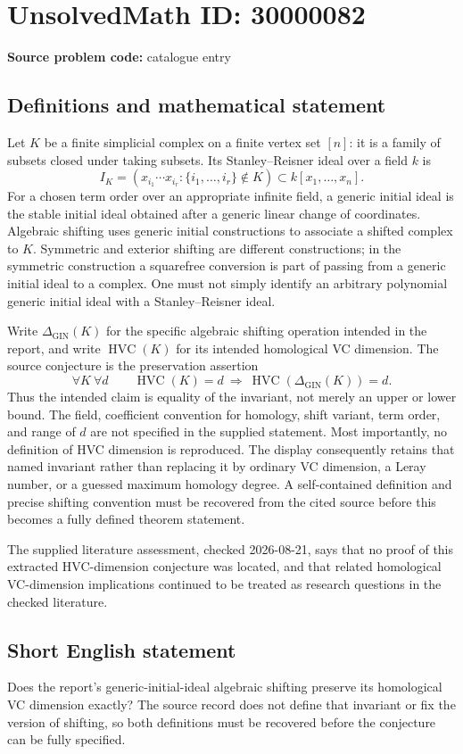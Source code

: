 \documentclass[11pt]{article}
\begin{document}
\section*{UnsolvedMath ID: 30000082}
\textbf{Source problem code:} catalogue entry
\subsection{Definitions and mathematical statement}
Let \(K\) be a finite simplicial complex on a finite vertex set \([n]\): it is a family of subsets closed under taking subsets. Its Stanley--Reisner ideal over a field \(k\) is
\[
I_K=(x_{i_1}\cdots x_{i_r}:\{i_1,\ldots,i_r\}\notin K)
\subset k[x_1,\ldots,x_n].
\]
For a chosen term order over an appropriate infinite field, a generic initial ideal is the stable initial ideal obtained after a generic linear change of coordinates. Algebraic shifting uses generic initial constructions to associate a shifted complex to \(K\). Symmetric and exterior shifting are different constructions; in the symmetric construction a squarefree conversion is part of passing from a generic initial ideal to a complex. One must not simply identify an arbitrary polynomial generic initial ideal with a Stanley--Reisner ideal.

Write \(\Delta_{\mathrm{GIN}}(K)\) for the specific algebraic shifting operation intended in the report, and write \(\operatorname{HVC}(K)\) for its intended homological VC dimension. The source conjecture is the preservation assertion
\[
\forall K\ \forall d\qquad
\operatorname{HVC}(K)=d\ \Longrightarrow\
\operatorname{HVC}(\Delta_{\mathrm{GIN}}(K))=d.
\]
Thus the intended claim is equality of the invariant, not merely an upper or lower bound. The field, coefficient convention for homology, shift variant, term order, and range of \(d\) are not specified in the supplied statement. Most importantly, no definition of HVC dimension is reproduced. The display consequently retains that named invariant rather than replacing it by ordinary VC dimension, a Leray number, or a guessed maximum homology degree. A self-contained definition and precise shifting convention must be recovered from the cited source before this becomes a fully defined theorem statement.

The supplied literature assessment, checked 2026-08-21, says that no proof of this extracted HVC-dimension conjecture was located, and that related homological VC-dimension implications continued to be treated as research questions in the checked literature.
\subsection{Short English statement}
Does the report's generic-initial-ideal algebraic shifting preserve its homological VC dimension exactly? The source record does not define that invariant or fix the version of shifting, so both definitions must be recovered before the conjecture can be fully specified.
\end{document}
